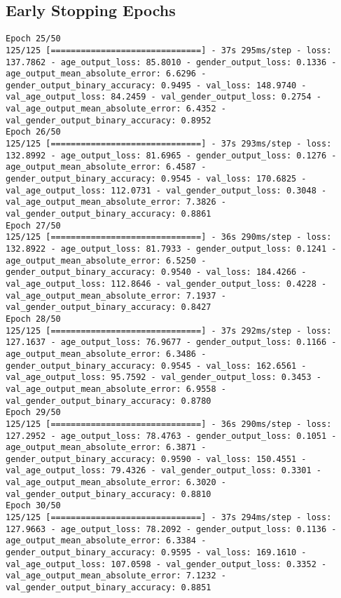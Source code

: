 \subsection{Early Stopping Epochs}\label{appendix:modelB_early_stopping_epochs}
\begin{lstlisting}
Epoch 25/50 
125/125 [==============================] - 37s 295ms/step - loss: 137.7862 - age_output_loss: 85.8010 - gender_output_loss: 0.1336 - age_output_mean_absolute_error: 6.6296 - gender_output_binary_accuracy: 0.9495 - val_loss: 148.9740 - val_age_output_loss: 84.2459 - val_gender_output_loss: 0.2754 - val_age_output_mean_absolute_error: 6.4352 - val_gender_output_binary_accuracy: 0.8952
Epoch 26/50
125/125 [==============================] - 37s 293ms/step - loss: 132.8992 - age_output_loss: 81.6965 - gender_output_loss: 0.1276 - age_output_mean_absolute_error: 6.4587 - gender_output_binary_accuracy: 0.9545 - val_loss: 170.6825 - val_age_output_loss: 112.0731 - val_gender_output_loss: 0.3048 - val_age_output_mean_absolute_error: 7.3826 - val_gender_output_binary_accuracy: 0.8861
Epoch 27/50
125/125 [==============================] - 36s 290ms/step - loss: 132.8922 - age_output_loss: 81.7933 - gender_output_loss: 0.1241 - age_output_mean_absolute_error: 6.5250 - gender_output_binary_accuracy: 0.9540 - val_loss: 184.4266 - val_age_output_loss: 112.8646 - val_gender_output_loss: 0.4228 - val_age_output_mean_absolute_error: 7.1937 - val_gender_output_binary_accuracy: 0.8427
Epoch 28/50
125/125 [==============================] - 37s 292ms/step - loss: 127.1637 - age_output_loss: 76.9677 - gender_output_loss: 0.1166 - age_output_mean_absolute_error: 6.3486 - gender_output_binary_accuracy: 0.9545 - val_loss: 162.6561 - val_age_output_loss: 95.7592 - val_gender_output_loss: 0.3453 - val_age_output_mean_absolute_error: 6.9558 - val_gender_output_binary_accuracy: 0.8780
Epoch 29/50
125/125 [==============================] - 36s 290ms/step - loss: 127.2952 - age_output_loss: 78.4763 - gender_output_loss: 0.1051 - age_output_mean_absolute_error: 6.3871 - gender_output_binary_accuracy: 0.9590 - val_loss: 150.4551 - val_age_output_loss: 79.4326 - val_gender_output_loss: 0.3301 - val_age_output_mean_absolute_error: 6.3020 - val_gender_output_binary_accuracy: 0.8810
Epoch 30/50
125/125 [==============================] - 37s 294ms/step - loss: 127.9663 - age_output_loss: 78.2092 - gender_output_loss: 0.1136 - age_output_mean_absolute_error: 6.3384 - gender_output_binary_accuracy: 0.9595 - val_loss: 169.1610 - val_age_output_loss: 107.0598 - val_gender_output_loss: 0.3352 - val_age_output_mean_absolute_error: 7.1232 - val_gender_output_binary_accuracy: 0.8851
\end{lstlisting}
